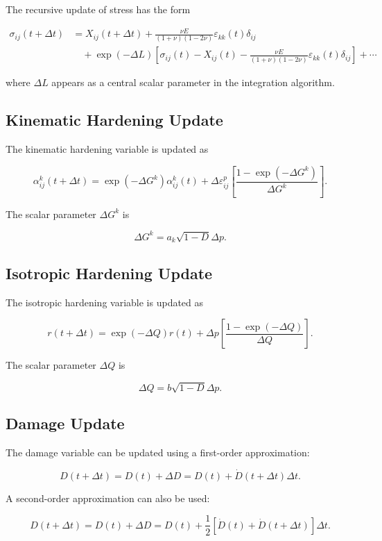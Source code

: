 ﻿\documentclass[11pt,a4paper]{article}
\begin{document}
The recursive update of stress has the form

\[
\begin{aligned}
\sigma_{ij}(t+\Delta t)
&=
X_{ij}(t+\Delta t)
+
\frac{\nu E}{(1+\nu)(1-2\nu)}\varepsilon_{kk}(t)\delta_{ij} \\
&\quad
+
\exp(-\Delta L)
\left[
\sigma_{ij}(t)-X_{ij}(t)
-
\frac{\nu E}{(1+\nu)(1-2\nu)}\varepsilon_{kk}(t)\delta_{ij}
\right]
+
\cdots
\end{aligned}
\]

where $\Delta L$ appears as a central scalar parameter in the integration algorithm.

\subsection{Kinematic Hardening Update}

The kinematic hardening variable is updated as

\[
\alpha^k_{ij}(t+\Delta t)
=
\exp(-\Delta G^k)\alpha^k_{ij}(t)
+
\Delta \varepsilon^p_{ij}
\left[
\frac{1-\exp(-\Delta G^k)}{\Delta G^k}
\right].
\]

The scalar parameter $\Delta G^k$ is

\[
\Delta G^k
=
a_k \sqrt{1-D}\Delta p.
\]

\subsection{Isotropic Hardening Update}

The isotropic hardening variable is updated as

\[
r(t+\Delta t)
=
\exp(-\Delta Q)r(t)
+
\Delta p
\left[
\frac{1-\exp(-\Delta Q)}{\Delta Q}
\right].
\]

The scalar parameter $\Delta Q$ is

\[
\Delta Q
=
b\sqrt{1-D}\Delta p.
\]

\subsection{Damage Update}

The damage variable can be updated using a first-order approximation:

\[
D(t+\Delta t)
=
D(t)
+
\Delta D
=
D(t)
+
\dot{D}(t+\Delta t)\Delta t.
\]

A second-order approximation can also be used:

\[
D(t+\Delta t)
=
D(t)
+
\Delta D
=
D(t)
+
\frac{1}{2}
\left[
\dot{D}(t)+\dot{D}(t+\Delta t)
\right]\Delta t.
\]
\end{document}
